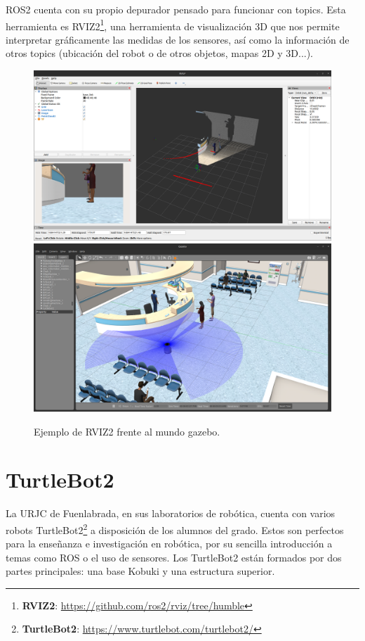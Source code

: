 ROS2 cuenta con su propio depurador pensado para funcionar con topics. Esta herramienta es
RVIZ2\footnote{\textbf{RVIZ2}: \url{https://github.com/ros2/rviz/tree/humble}}, una herramienta de visualización 3D que nos permite
interpretar gráficamente las medidas de los sensores, así como la información de otros topics (ubicación del robot o de otros objetos, mapas 2D y 3D...).

\begin{figure} [H]
    \begin{center}
        \includegraphics[width=12cm]{figs/c3/RVIZ2.png}
        \includegraphics[width=12cm]{figs/c3/Gazebo_RVIZ.png}
    \end{center}
    \caption[RVIZ2 Vs mundo gazebo]{Ejemplo de RVIZ2 frente al mundo gazebo.}
    \label{fig:rviz2_example}
\end{figure}

\newpage

\section{TurtleBot2}
\label{sec:turtlebot2}

La URJC de Fuenlabrada, en sus laboratorios de robótica, cuenta con varios robots 
TurtleBot2\footnote{\textbf{TurtleBot2}: \url{https://www.turtlebot.com/turtlebot2/}} a disposición de los alumnos del grado. Estos son perfectos para
la enseñanza e investigación en robótica, por su sencilla introducción a temas como ROS o el uso de sensores. Los TurtleBot2 están formados por dos partes
principales: una base Kobuki y una estructura superior.


